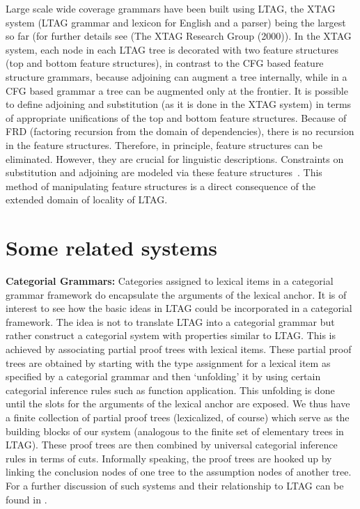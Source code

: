 Large scale wide coverage grammars have been built using LTAG, the
XTAG system (LTAG grammar and lexicon for English and a parser) being
the largest so far (for further details see (The XTAG Research Group
(2000)). In the XTAG system, each node in each LTAG tree is decorated
with two feature structures (top and bottom feature structures), in
contrast to the CFG based feature structure grammars, because
adjoining can augment a tree internally, while in a CFG based grammar
a tree can be augmented only at the frontier. It is possible to define
adjoining and substitution (as it is done in the XTAG system) in terms
of appropriate unifications of the top and bottom feature
structures. Because of FRD (factoring recursion from the domain of
dependencies), there is no recursion in the feature
structures. Therefore, in principle, feature structures can be
eliminated. However, they are crucial for linguistic
descriptions. Constraints on substitution and adjoining are modeled
via these feature structures~\cite{vijay87}. This method of
manipulating feature structures is a direct consequence of the
extended domain of locality of LTAG.

\section{Some related systems}

{\bf Categorial Grammars:} Categories assigned to lexical items in a
categorial grammar framework do encapsulate the arguments of the
lexical anchor. It is of interest to see how the basic ideas in LTAG
could be incorporated in a categorial framework. The idea is not to
translate LTAG into a categorial grammar but rather construct a
categorial system with properties similar to LTAG. This is achieved by
associating partial proof trees with lexical items. These partial
proof trees are obtained by starting with the type assignment for a
lexical item as specified by a categorial grammar and then `unfolding'
it by using certain categorial inference rules such as function
application. This unfolding is done until the slots for the arguments
of the lexical anchor are exposed. We thus have a finite collection of
partial proof trees (lexicalized, of course) which serve as the
building blocks of our system (analogous to the finite set of
elementary trees in LTAG). These proof trees are then combined by
universal categorial inference rules in terms of cuts. Informally
speaking, the proof trees are hooked up by linking the conclusion
nodes of one tree to the assumption nodes of another tree. For a
further discussion of such systems and their relationship to LTAG can
be found in \cite{JoshiKulick97,joshi99:_proof_trees}.

